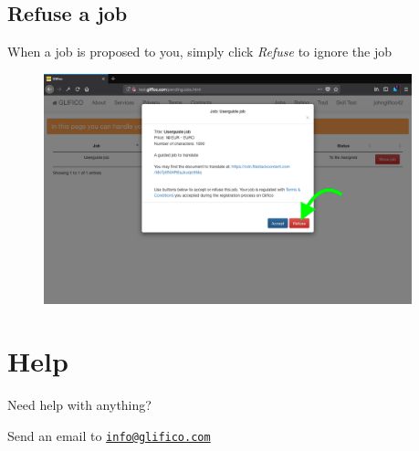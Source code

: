 \documentclass[11 pt, a4paper]{article}
\begin{document}
\clearpage
\subsection{Refuse a job}
When a job is proposed to you, simply click \textit{Refuse} to ignore the job
\begin{figure}[H]
\centering
\includegraphics[width=0.95\textwidth]{translator_job3_del.png}
\end{figure}

\clearpage
\section{Help}
Need help with anything?

Send an email to \href{mailto:info@glifico.com}{\nolinkurl{info@glifico.com}}
\end{document}
